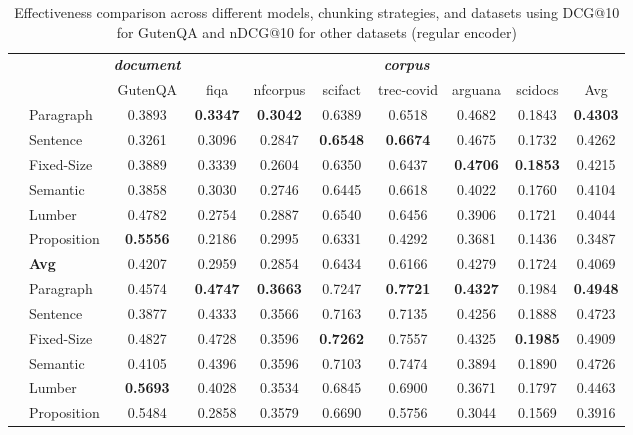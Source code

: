 \begin{table}[htbp]
	\centering
		\caption{Effectiveness comparison across different models, chunking strategies, and datasets using DCG@10 for GutenQA and nDCG@10 for other datasets (regular encoder)}
	\label{tab:results_regular_encoder}
	\begin{tabular}{llcccccccc}
		\toprule
		&  & \multicolumn{1}{c}{\textbf{\textit{document}}} & \multicolumn{7}{c}{\textbf{\textit{corpus}}} \\
		\cmidrule(lr){3-3} \cmidrule(lr){4-10}
		&  & GutenQA & fiqa & nfcorpus & scifact & trec-covid & arguana & scidocs & Avg \\
		\midrule
		\multirow{6}{*}{\rotatebox{90}{\textbf{Jina-v2}}} & Paragraph & 0.3893 & \textbf{0.3347} & \textbf{0.3042} & 0.6389 & 0.6518 & 0.4682 & 0.1843 & \textbf{0.4303} \\
		& Sentence & 0.3261 & 0.3096 & 0.2847 & \textbf{0.6548} & \textbf{0.6674} & 0.4675 & 0.1732 & 0.4262 \\
		& Fixed-Size & 0.3889 & 0.3339 & 0.2604 & 0.6350 & 0.6437 & \textbf{0.4706} & \textbf{0.1853} & 0.4215 \\
		& Semantic & 0.3858 & 0.3030 & 0.2746 & 0.6445 & 0.6618 & 0.4022 & 0.1760 & 0.4104 \\
		& Lumber & 0.4782 & 0.2754 & 0.2887 & 0.6540 & 0.6456 & 0.3906 & 0.1721 & 0.4044 \\
		& Proposition & \textbf{0.5556} & 0.2186 & 0.2995 & 0.6331 & 0.4292 & 0.3681 & 0.1436 & 0.3487 \\
		& \textbf{Avg} & 0.4207 & 0.2959 & 0.2854 & 0.6434 & 0.6166 & 0.4279 & 0.1724 & 0.4069 \\
		\midrule
		\multirow{6}{*}{\rotatebox{90}{\textbf{Jina-v3}}} & Paragraph & 0.4574 & \textbf{0.4747} & \textbf{0.3663} & 0.7247 & \textbf{0.7721} & \textbf{0.4327} & 0.1984 & \textbf{0.4948} \\
		& Sentence & 0.3877 & 0.4333 & 0.3566 & 0.7163 & 0.7135 & 0.4256 & 0.1888 & 0.4723 \\
		& Fixed-Size & 0.4827 & 0.4728 & 0.3596 & \textbf{0.7262} & 0.7557 & 0.4325 & \textbf{0.1985} & 0.4909 \\
		& Semantic & 0.4105 & 0.4396 & 0.3596 & 0.7103 & 0.7474 & 0.3894 & 0.1890 & 0.4726 \\
		& Lumber & \textbf{0.5693} & 0.4028 & 0.3534 & 0.6845 & 0.6900 & 0.3671 & 0.1797 & 0.4463 \\
		& Proposition & 0.5484 & 0.2858 & 0.3579 & 0.6690 & 0.5756 & 0.3044 & 0.1569 & 0.3916 \\

\end{tabular}
\end{table}
